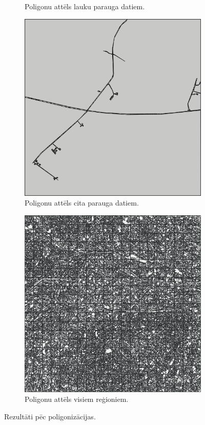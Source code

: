 \documentclass[12pt,paper=a4]{report}
\begin{document}
\begin{figure}[h!]
\begin{subfigure}[b]{.3\linewidth}
\caption{Poligonu attēls lauku parauga datiem.}\label{fig:lauksPoly}
\end{subfigure}
\begin{subfigure}[b]{.3\linewidth}
\includegraphics[width=\linewidth]{citsPolygons}
\caption{Poligonu attēls cita parauga datiem.}
\label{citsPoly}
\end{subfigure}
\begin{subfigure}[b]{.3\linewidth}
\includegraphics[width=\linewidth]{vissPolygons}
\caption{Poligonu attēls visiem reģioniem.}\label{vissPoly}
\end{subfigure}
\caption{Rezultāti pēc poligonizācijas.}
\label{fig:poly}
\end{figure}\par
\end{document}
